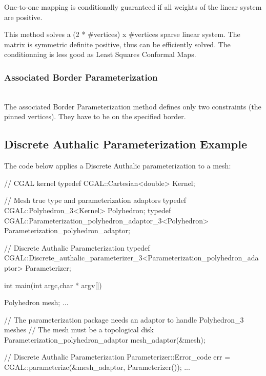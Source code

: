 One-to-one mapping is conditionally guaranteed if all weights
of the linear system are positive.

This method solves a (2 * \#vertices) x \#vertices sparse linear system.
The matrix is symmetric definite positive, thus can be
efficiently solved. The conditionning is less good as Least Squares Conformal Maps.


\subsubsection{Associated Border Parameterization}

  \\

The associated Border Parameterization method defines only two constraints
(the pinned vertices). They have to be on the specified border.


\subsection{Discrete Authalic Parameterization Example}

The code below applies a Discrete Authalic parameterization to a  mesh:

\begin{ccExampleCode}

// CGAL kernel
typedef CGAL::Cartesian<double>                         Kernel;

// Mesh true type and parameterization adaptors
typedef CGAL::Polyhedron_3<Kernel>                      Polyhedron;
typedef CGAL::Parameterization_polyhedron_adaptor_3<Polyhedron>
                                                        Parameterization_polyhedron_adaptor;

// Discrete Authalic Parameterization
typedef CGAL::Discrete_authalic_parameterizer_3<Parameterization_polyhedron_adaptor>
                                                        Parameterizer;

int main(int argc,char * argv[])
{
    Polyhedron mesh;
    ...

    // The parameterization package needs an adaptor to handle Polyhedron_3 meshes
    // The mesh must be a topological disk
    Parameterization_polyhedron_adaptor mesh_adaptor(&mesh);

    // Discrete Authalic Parameterization
    Parameterizer::Error_code err = CGAL::parameterize(&mesh_adaptor, Parameterizer());
    ...
}

\end{ccExampleCode}

